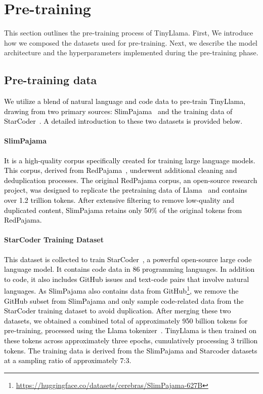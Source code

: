 \documentclass{article}
\begin{document}
\section{Pre-training}
\vspace{-1em}
This section outlines the pre-training process of TinyLlama.
First, We introduce how we composed the datasets used for pre-training.
Next, we describe the model architecture and the hyperparameters implemented during the pre-training phase.
\vspace{-0.3em}
\subsection{Pre-training data}
\vspace{-0.2em}
\textcolor{black}{
We utilize a blend of natural language and code data to pre-train TinyLlama, drawing from two primary sources:
    SlimPajama~\citep{cerebras2023slimpajama} and the training data of StarCoder~\citep{li2023starcoder}.
A detailed introduction to these two datasets is provided below.
}
\vspace{-1em}
\paragraph{SlimPajama}
\textcolor{black}{
It is a high-quality corpus specifically created for training large language models.
This corpus, derived from RedPajama~\citep{together2023redpajama}, underwent additional cleaning and deduplication processes.
The original RedPajama corpus, an open-source research project, was designed to replicate the pretraining data of Llama~\citep{touvron2023llama} and contains over 1.2 trillion tokens.
After extensive filtering to remove low-quality and duplicated content, SlimPajama retains only 50\% of the original tokens from RedPajama.
}
\vspace{-1em}
\paragraph{StarCoder Training Dataset}
\textcolor{black}{
This dataset is collected to train StarCoder~\citep{li2023starcoder}, a powerful open-source large code language model.
It contains code data in 86 programming languages.
In addition to code, it also includes GitHub issues and text-code pairs that involve natural languages.
As SlimPajama also contains data from GitHub\footnote{\url{https://huggingface.co/datasets/cerebras/SlimPajama-627B}},
    we remove the GitHub subset from SlimPajama and
        only sample code-related data from the StarCoder training dataset to avoid duplication.
}
\textcolor{black}{
After merging these two datasets, we obtained a combined total of approximately 950 billion tokens for pre-training,
    processed using the Llama tokenizer~\citep{touvron2023llama,touvron2023llama2}.
TinyLlama is then trained on these tokens across approximately three epochs, cumulatively processing 3 trillion tokens.
The training data is derived from the SlimPajama and Starcoder datasets at a sampling ratio of approximately 7:3.
}
\end{document}
